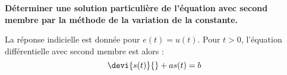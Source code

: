 \textbf{Déterminer une solution particulière de l'équation avec second membre par                                                         
la méthode de la variation de la constante.}                                                                                              
                                                                                                                                          
La réponse indicielle est donnée pour $e(t)=u(t)$. Pour $t>0$, l'équation différentielle                                                  
avec second membre est alors :                                                                                                            
$$                                                                                                                                        
\devi{s(t)}{}+as(t)=b                                                                                                                     
$$                                                                                                                                        
                                                                                                                                          
